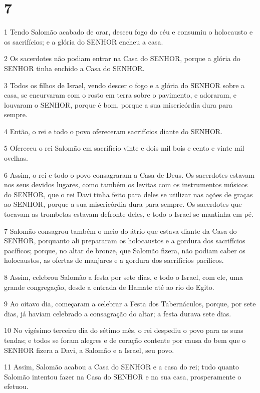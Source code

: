 \chapter{7}

\par 1 Tendo Salomão acabado de orar, desceu fogo do céu e consumiu o holocausto e os sacrifícios; e a glória do SENHOR encheu a casa.
\par 2 Os sacerdotes não podiam entrar na Casa do SENHOR, porque a glória do SENHOR tinha enchido a Casa do SENHOR.
\par 3 Todos os filhos de Israel, vendo descer o fogo e a glória do SENHOR sobre a casa, se encurvaram com o rosto em terra sobre o pavimento, e adoraram, e louvaram o SENHOR, porque é bom, porque a sua misericórdia dura para sempre.
\par 4 Então, o rei e todo o povo ofereceram sacrifícios diante do SENHOR.
\par 5 Ofereceu o rei Salomão em sacrifício vinte e dois mil bois e cento e vinte mil ovelhas.
\par 6 Assim, o rei e todo o povo consagraram a Casa de Deus. Os sacerdotes estavam nos seus devidos lugares, como também os levitas com os instrumentos músicos do SENHOR, que o rei Davi tinha feito para deles se utilizar nas ações de graças ao SENHOR, porque a sua misericórdia dura para sempre. Os sacerdotes que tocavam as trombetas estavam defronte deles, e todo o Israel se mantinha em pé.
\par 7 Salomão consagrou também o meio do átrio que estava diante da Casa do SENHOR, porquanto ali prepararam os holocaustos e a gordura dos sacrifícios pacíficos; porque, no altar de bronze, que Salomão fizera, não podiam caber os holocaustos, as ofertas de manjares e a gordura dos sacrifícios pacíficos.
\par 8 Assim, celebrou Salomão a festa por sete dias, e todo o Israel, com ele, uma grande congregação, desde a entrada de Hamate até ao rio do Egito.
\par 9 Ao oitavo dia, começaram a celebrar a Festa dos Tabernáculos, porque, por sete dias, já haviam celebrado a consagração do altar; a festa durava sete dias.
\par 10 No vigésimo terceiro dia do sétimo mês, o rei despediu o povo para as suas tendas; e todos se foram alegres e de coração contente por causa do bem que o SENHOR fizera a Davi, a Salomão e a Israel, seu povo.
\par 11 Assim, Salomão acabou a Casa do SENHOR e a casa do rei; tudo quanto Salomão intentou fazer na Casa do SENHOR e na sua casa, prosperamente o efetuou.
